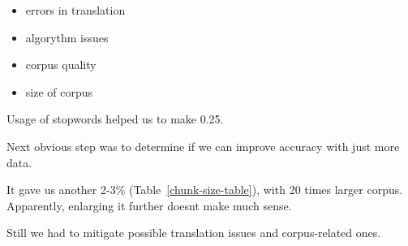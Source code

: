 \documentclass[11pt,letterpaper]{article}
\begin{document}
\begin{itemize}
\item errors in translation 
\item algorythm issues
\item corpus quality
\item size of corpus
\end{itemize}

Usage of stopwords helped us to make 0.25. 

Next obvious step was to determine if we can improve accuracy with just more data.

It gave us another 2-3\% (Table~\ref{chunk-size-table}), with 20 times larger
corpus. Apparently, enlarging it further doesnt make much sense.

Still we had to mitigate possible translation issues and corpus-related ones.
\end{document}
